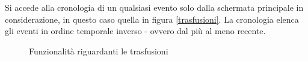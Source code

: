 \documentclass[12pt,a4paper,openright,twoside]{report}
\begin{document}
Si accede alla cronologia di un qualsiasi evento solo dalla schermata principale in considerazione, in questo caso quella in figura \ref{trasfusioni}. La cronologia elenca gli eventi in ordine temporale inverso - ovvero dal più al meno recente.

\begin{figure}[H]
\centering
{} \quad
{} \quad
{} \quad
\caption{Funzionalità riguardanti le trasfusioni}
\label{trasfusioni1}
\end{figure}
\end{document}

